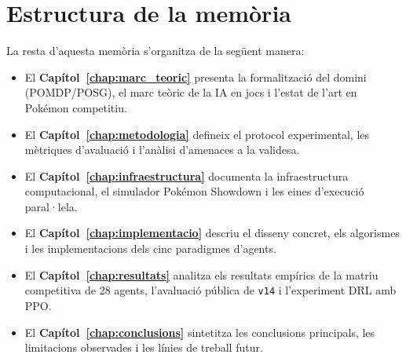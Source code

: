 \section{Estructura de la memòria}

La resta d'aquesta memòria s'organitza de la següent manera:
\begin{itemize}
    \item El \textbf{Capítol~\ref{chap:marc_teoric}} presenta la formalització del domini (POMDP/POSG), el marc teòric de la IA en jocs i l'estat de l'art en Pokémon competitiu.
    \item El \textbf{Capítol~\ref{chap:metodologia}} defineix el protocol experimental, les mètriques d'avaluació i l'anàlisi d'amenaces a la validesa.
    \item El \textbf{Capítol~\ref{chap:infraestructura}} documenta la infraestructura computacional, el simulador Pokémon Showdown i les eines d'execució paral·lela.
    \item El \textbf{Capítol~\ref{chap:implementacio}} descriu el disseny concret, els algorismes i les implementacions dels cinc paradigmes d'agents.
    \item El \textbf{Capítol~\ref{chap:resultats}} analitza els resultats empírics de la matriu competitiva de 28 agents, l'avaluació pública de \texttt{v14} i l'experiment DRL amb PPO.
    \item El \textbf{Capítol~\ref{chap:conclusions}} sintetitza les conclusions principals, les limitacions observades i les línies de treball futur.
\end{itemize}
